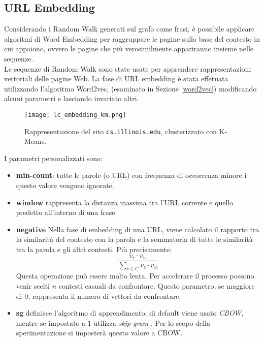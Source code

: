 \subsection{URL Embedding}
Considerando i Random Walk generati sul grafo come frasi, è possibile applicare algoritmi di Word Embedding per raggruppare le pagine sulla base del contesto in cui appaiono, ovvero le pagine che più verosimilmente appariranno insieme nelle sequenze.
\\
Le sequenze di Random Walk sono state usate per apprendere rappresentazioni vettoriali delle pagine Web. La fase di URL embedding è stata effetuata utilizzando l'algoritmo Word2vec, \cite{gensim} (esaminato in Sezione \ref{word2vec}) modificando alcuni parametri e lasciando invariato altri.
\\
\begin{figure}[h!]
	\centering
	\texttt{[image: lc\_embedding\_km.png]}
	\caption{Rappresentazione del sito \texttt{cs.illinois.edu}, clusterizzato con K-Means.}
	\label{nc_embedding_km}
\end{figure}
I parametri personalizzati sono:
\begin{itemize}
\item \textbf{min-count}: tutte le parole (o URL) con frequenza di occorrenza minore i questo valore vengono ignorate.
\item \textbf{window} rappresenta la distanza massima tra l'URL corrente e quello predetto all'interno di una frase.
\item \textbf{negative} Nella fase di embedding di una URL, viene calcolato il rapporto tra la similarità del contesto con la parola e la sommatoria di tutte le similarità tra la parola e gli altri contesti. Più precisamente:
\begin{equation}
\frac{v_c \cdot v_w}{\sum\limits_{c \in C} v_c \cdot v_w}
\end{equation}
Questa operazione può essere molto lenta. Per accelerare il processo possono venir scelti $n$ contesti casuali da confrontare. Questo parametro, se maggiore di $0$, rappresenta il numero di vettori da confrontare.
\item \textbf{sg} definisce l'algoritmo di apprendimento, di default viene usato \textit{CBOW}, mentre se impostato a $1$ utilizza \textit{skip-gram} \cite{Mikolov13}. Per lo scopo della sperimentazione si imposterà questo valore a  CBOW.
\end{itemize}

